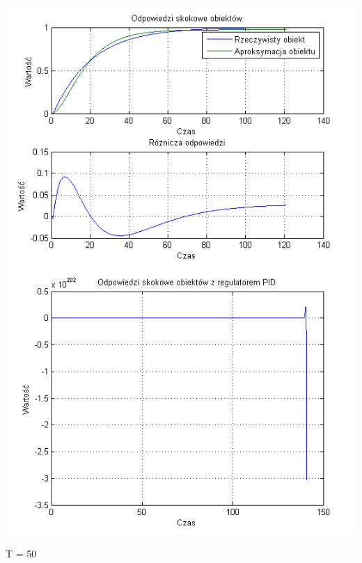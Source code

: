\documentclass[10pt,a4paper]{article}
\begin{document}
\begin{center}
\includegraphics[scale=1]{images/dwa/skrypt_31.png}\\
\includegraphics[scale=1]{images/dwa/skrypt_32.png}\\
\end{center}
\newpage
T = 50
\end{document}

